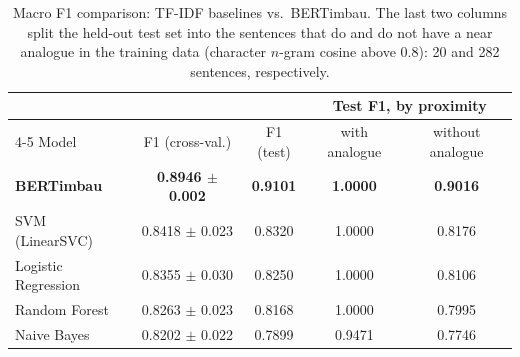 \begin{table}[!t]
\centering
\caption{Macro F1 comparison: TF-IDF baselines vs.\ BERTimbau. The last two columns split the held-out test set into the sentences that do and do not have a near analogue in the training data (character $n$-gram cosine above 0.8): 20 and 282 sentences, respectively.}
\label{tab:baselines}
\begin{tabular}{lcccc}
\toprule
 & & & \multicolumn{2}{c}{Test F1, by proximity} \\
\cline{4-5}
Model & F1 (cross-val.) & F1 (test) & with analogue & without analogue \\
\midrule
\textbf{BERTimbau} & \textbf{0.8946 $\pm$ 0.002} & \textbf{0.9101} & \textbf{1.0000} & \textbf{0.9016} \\
SVM (LinearSVC) & 0.8418 $\pm$ 0.023 & 0.8320 & 1.0000 & 0.8176 \\
Logistic Regression & 0.8355 $\pm$ 0.030 & 0.8250 & 1.0000 & 0.8106 \\
Random Forest & 0.8263 $\pm$ 0.023 & 0.8168 & 1.0000 & 0.7995 \\
Naive Bayes & 0.8202 $\pm$ 0.022 & 0.7899 & 0.9471 & 0.7746 \\
\bottomrule
\end{tabular}
\end{table}
